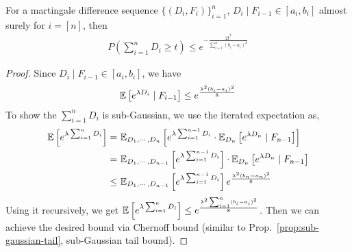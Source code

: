 \begin{theorem}
For a martingale difference sequence $\{(D_i, F_i)\}_{i=1}^n$, $D_i \mid F_{i-1} \in [a_i, b_i]$ almost surely for $i=[n]$, then
\begin{align*}
    P\left(\sum_{i=1}^n D_i \geq t\right) \leq e^{-\frac{2t^2}{\sum_{i=1}^n (b_i - a_i)^2}}
\end{align*}
\end{theorem}
\begin{proof}
Since $D_i \mid F_{i-1} \in [a_i, b_i]$, we have
\begin{align*}
    \mathbb{E}\left[ e^{\lambda D_i} \mid F_{i-1} \right] \leq e^{\frac{\lambda^2 (b_i - a_i)^2}{8}}
\end{align*}
To show the $\sum_{i=1}^n D_i$ is sub-Gaussian, we use the iterated expectation as, 
\begin{align*}
 \mathbb{E}\left[ e^{\lambda \sum_{i=1}^n D_i} \right]  = &\ \mathbb{E}_{D_1, \cdots, D_{n}}\left[ e^{\lambda \sum_{i=1}^{n-1} D_i} \cdot \mathbb{E}_{D_n}\left[ e^{\lambda D_n} \mid F_{n-1} \right] \right] \\
    = & \ \mathbb{E}_{D_1, \cdots, D_{n-1}}\left[ e^{\lambda \sum_{i=1}^{n-1} D_i} \right] \cdot \mathbb{E}_{D_n}\left[ e^{\lambda D_n} \mid F_{n-1} \right] \\
    \leq &\ \mathbb{E}_{D_1, \cdots, D_{n-1}}\left[ e^{\lambda \sum_{i=1}^{n-1} D_i} \right] e^{\frac{\lambda^2 (b_n - a_n)^2}{8}}
\end{align*}
Using it recursively, we get $\mathbb{E}\left[ e^{\lambda \sum_{i=1}^n D_i} \right] \leq e^{\frac{\lambda^2 \sum_{i=1}^n (b_i - a_i)^2}{8}}$. Then we can achieve the desired bound via Chernoff bound (similar to Prop.~\ref{prop:sub-gaussian-tail}, sub-Gaussian tail bound).
\end{proof}

